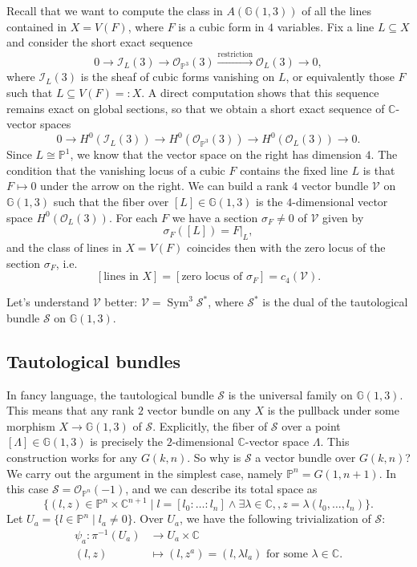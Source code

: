 \documentclass[12pt,a4paper]{amsart}
\theoremstyle{plain}
\theoremstyle{definition}
\theoremstyle{remark}
\begin{document}
Recall that we want to compute the class in $A(\mathbb{G}(1,3))$ of all the lines contained in $X = V(F)$, where $F$ is a cubic form in $4$ variables.
Fix a line $L \subseteq X$ and consider the short exact sequence
\[ 0 \to \mathscr{I}_{L}(3) \to \mathscr{O}_{\mathbb{P}^{3}}(3) \xrightarrow{\text{restriction}} \mathscr{O}_{L}(3) \to 0, \]
where $\mathscr{I}_{L}(3)$ is the sheaf of cubic forms vanishing on $L$, or equivalently those $F$ such that $L \subseteq V(F) =: X$.
A direct computation shows that this sequence remains exact on global sections, so that we obtain a short exact sequence of $\mathbb{C}$-vector spaces
\[ 0 \to H^{0}(\mathscr{I}_{L}(3)) \to H^{0}(\mathscr{O}_{\mathbb{P}^{3}}(3)) \to H^{0}(\mathscr{O}_{L}(3)) \to 0. \]
Since $L \cong \mathbb{P}^{1}$, we know that the vector space on the right has dimension $4$.
The condition that the vanishing locus of a cubic $F$ contains the fixed line $L$ is that $F \mapsto 0$ under the arrow on the right.
We can build a rank $4$ vector bundle $\mathscr{V}$ on $\mathbb{G}(1,3)$ such that the fiber over $[L] \in \mathbb{G}(1,3)$ is the $4$-dimensional vector space $H^{0}(\mathscr{O}_{L}(3))$.
For each $F$ we have a section $\sigma_{F} \neq 0$ of $\mathscr{V}$ given by
\[ \sigma_{F}([L]) = F|_{L}, \]
and the class of lines in $X = V(F)$ coincides then with the zero locus of the section $\sigma_{F}$, i.e.
\[ [ \text{lines in } X ] = [\text{zero locus of }\sigma_{F} ] = c_{4}(\mathscr{V}). \]

Let's understand $\mathscr{V}$ better: $\mathscr{V} = \operatorname{Sym}^{3}\mathscr{S}^{*}$, where $\mathscr{S}^{*}$ is the dual of the tautological bundle $\mathscr{S}$ on $\mathbb{G}(1,3)$.

\subsection{Tautological bundles}

In fancy language, the tautological bundle $\mathscr{S}$ is the universal family on $\mathbb{G}(1,3)$.
This means that any rank $2$ vector bundle on any $X$ is the pullback under some morphism $X \to \mathbb{G}(1,3)$ of $\mathscr{S}$.
Explicitly, the fiber of $\mathscr{S}$ over a point $[\Lambda] \in \mathbb{G}(1,3)$ is precisely the $2$-dimensional $\mathbb{C}$-vector space $\Lambda$.
This construction works for any $G(k,n)$.
So why is $\mathscr{S}$ a vector bundle over $G(k,n)$?
We carry out the argument in the simplest case, namely $\mathbb{P}^{n} = G(1, n+1)$.
In this case $\mathscr{S} = \mathscr{O}_{\mathbb{P}^{n}}(-1)$, and we can describe its total space as
\[ \{ (l,z) \in \mathbb{P}^{n} \times \mathbb{C}^{n+1} \mid l = [l_{0} : \ldots : l_{n}] \wedge \exists \lambda \in \mathbb{C},, z = \lambda(l_{0}, \ldots, l_{n}) \}. \]
Let $U_{a} = \{ l \in \mathbb{P}^{n} \mid l_{a} \neq 0 \}$.
Over $U_{a}$, we have the following trivialization of $\mathscr{S}$:
\begin{align*}
  \psi_{a} \colon \pi^{-1}(U_{a}) & \to U_{a} \times \mathbb{C} \\
  (l, z) & \mapsto (l, z^{a}) = (l,\lambda l_{a}) \text{ for some }\lambda \in \mathbb{C}.
\end{align*}
\end{document}
